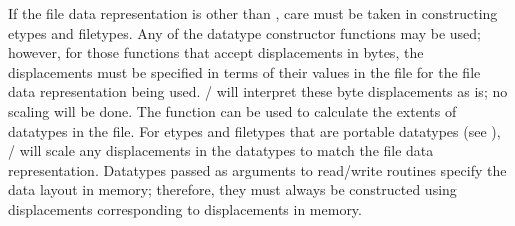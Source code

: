 If the file data representation is other than , care
must be taken in constructing etypes and filetypes.  Any of the
datatype constructor functions may be used; however, for those
functions that accept displacements in bytes, the displacements
must be specified in terms of their values in the file for the 
file data representation being used.
\MPI/ will interpret these byte displacements as is;
no scaling will be done.
The function
 can be used to calculate
the extents of datatypes in the file.  
For etypes and filetypes that are portable datatypes
(see ),
\MPI/ will scale any displacements in the datatypes
to match the file data representation.
Datatypes passed as 
arguments to read/write routines specify the data layout in
memory; therefore, they must always be constructed using
displacements corresponding to displacements in memory.

